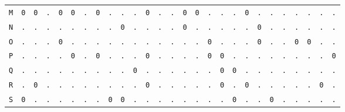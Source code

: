 \begin{figure}[H]
\begin{center}
{\begin{tabular}{c|cccccccccccccccccccccccccc}
				\texttt{M} & \texttt{0} & \texttt{0} & \texttt{.} & \texttt{0} & \texttt{0} & \texttt{.} & \texttt{0} & \texttt{.} & \texttt{.} & \texttt{.} & \texttt{0} & \texttt{.} & \texttt{.} & \texttt{0} & \texttt{0} & \texttt{.} & \texttt{.} & \texttt{.} & \texttt{0} & \texttt{.} & \texttt{.} & \texttt{.} & \texttt{.} & \texttt{.} & \texttt{.} & \texttt{.} \\
				\texttt{N} & \texttt{.} & \texttt{.} & \texttt{.} & \texttt{.} & \texttt{.} & \texttt{.} & \texttt{.} & \texttt{.} & \texttt{0} & \texttt{.} & \texttt{.} & \texttt{.} & \texttt{.} & \texttt{0} & \texttt{.} & \texttt{.} & \texttt{.} & \texttt{.} & \texttt{.} & \texttt{0} & \texttt{.} & \texttt{.} & \texttt{.} & \texttt{.} & \texttt{.} & \texttt{.} \\
				\texttt{O} & \texttt{.} & \texttt{.} & \texttt{.} & \texttt{0} & \texttt{.} & \texttt{.} & \texttt{.} & \texttt{.} & \texttt{.} & \texttt{.} & \texttt{.} & \texttt{.} & \texttt{.} & \texttt{.} & \texttt{.} & \texttt{0} & \texttt{.} & \texttt{.} & \texttt{.} & \texttt{0} & \texttt{.} & \texttt{.} & \texttt{0} & \texttt{0} & \texttt{.} & \texttt{.} \\
				\texttt{P} & \texttt{.} & \texttt{.} & \texttt{.} & \texttt{.} & \texttt{0} & \texttt{.} & \texttt{0} & \texttt{.} & \texttt{.} & \texttt{.} & \texttt{0} & \texttt{.} & \texttt{.} & \texttt{.} & \texttt{.} & \texttt{0} & \texttt{0} & \texttt{.} & \texttt{.} & \texttt{.} & \texttt{.} & \texttt{.} & \texttt{.} & \texttt{.} & \texttt{.} & \texttt{0} \\
				\texttt{Q} & \texttt{.} & \texttt{.} & \texttt{.} & \texttt{.} & \texttt{.} & \texttt{.} & \texttt{.} & \texttt{.} & \texttt{.} & \texttt{0} & \texttt{.} & \texttt{.} & \texttt{.} & \texttt{.} & \texttt{.} & \texttt{.} & \texttt{0} & \texttt{0} & \texttt{.} & \texttt{.} & \texttt{.} & \texttt{.} & \texttt{.} & \texttt{.} & \texttt{.} & \texttt{.} \\
				\texttt{R} & \texttt{.} & \texttt{0} & \texttt{.} & \texttt{.} & \texttt{.} & \texttt{.} & \texttt{.} & \texttt{.} & \texttt{.} & \texttt{.} & \texttt{0} & \texttt{.} & \texttt{.} & \texttt{.} & \texttt{.} & \texttt{.} & \texttt{0} & \texttt{.} & \texttt{0} & \texttt{.} & \texttt{.} & \texttt{.} & \texttt{.} & \texttt{.} & \texttt{0} & \texttt{.} \\
				\texttt{S} & \texttt{0} & \texttt{.} & \texttt{.} & \texttt{.} & \texttt{.} & \texttt{.} & \texttt{.} & \texttt{0} & \texttt{0} & \texttt{.} & \texttt{.} & \texttt{.} & \texttt{.} & \texttt{.} & \texttt{.} & \texttt{.} & \texttt{.} & \texttt{0} & \texttt{.} & \texttt{.} & \texttt{0} & \texttt{.} & \texttt{.} & \texttt{.} & \texttt{.} & \texttt{.} \\

\end{tabular}}
\end{center}
\end{figure}
